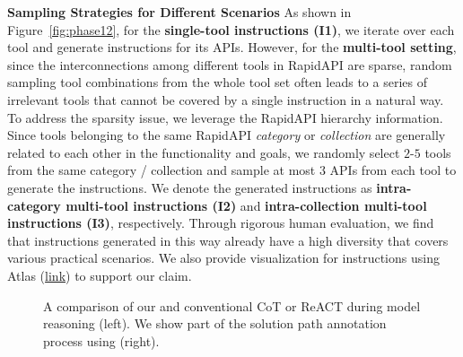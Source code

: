 \textbf{Sampling Strategies for Different Scenarios} \quad
As shown in Figure~\ref{fig:phase12}, for the \textbf{single-tool instructions (I1)}, we iterate over each tool and generate instructions for its APIs. However, for the \textbf{multi-tool setting}, since the interconnections among different tools in RapidAPI are sparse, random sampling tool combinations from the whole tool set often leads to a series of irrelevant tools that cannot be covered by a single instruction in a natural way. To address the sparsity issue, we leverage the RapidAPI hierarchy information.
Since tools belonging to the same RapidAPI \textit{category} or \textit{collection} are generally related to each other in the functionality and goals, we randomly select $2$-$5$ tools from the same category / collection and sample at most $3$ APIs from each tool to generate the instructions. We denote the generated instructions as \textbf{intra-category multi-tool instructions (I2)} and \textbf{intra-collection multi-tool instructions (I3)}, respectively. Through rigorous human evaluation, we find that instructions generated in this way already have a high diversity that covers various practical scenarios. We also provide visualization for instructions using Atlas (\textcolor{blue}{\href{https://atlas.nomic.ai/map/58aca169-c29a-447a-8f01-0d418fc4d341/030ddad7-5305-461c-ba86-27e1ca79d899}{link}}) to support our claim.

\begin{figure}[!t]
    \centering
    \caption{
    \small{A comparison of our \dfs and conventional CoT or ReACT during model reasoning (left). We show part of the solution path annotation process using \turbo (right).}
    }
    \label{fig:phase3}
\end{figure}


